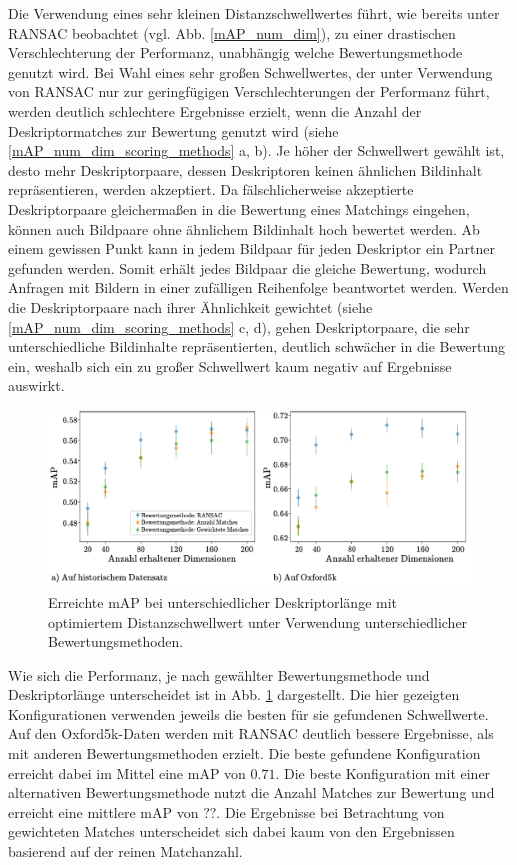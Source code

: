 Die Verwendung eines sehr kleinen Distanzschwellwertes führt, wie bereits unter RANSAC beobachtet (vgl. Abb. \ref{mAP_num_dim}), zu einer drastischen Verschlechterung der Performanz, unabhängig welche Bewertungsmethode genutzt wird. Bei Wahl eines sehr großen Schwellwertes, der unter Verwendung von RANSAC nur zur geringfügigen Verschlechterungen der Performanz führt, werden deutlich schlechtere Ergebnisse erzielt, wenn die Anzahl der Deskriptormatches zur Bewertung genutzt wird (siehe \ref{mAP_num_dim_scoring_methods} a, b). Je höher der Schwellwert gewählt ist, desto mehr Deskriptorpaare, dessen Deskriptoren keinen ähnlichen Bildinhalt repräsentieren, werden akzeptiert. Da fälschlicherweise akzeptierte Deskriptorpaare gleichermaßen in die Bewertung eines Matchings eingehen, können auch Bildpaare ohne ähnlichem Bildinhalt hoch bewertet werden. Ab einem gewissen Punkt kann in jedem Bildpaar für jeden Deskriptor ein Partner gefunden werden. Somit erhält jedes Bildpaar die gleiche Bewertung, wodurch Anfragen mit Bildern in einer zufälligen Reihenfolge beantwortet werden. Werden die Deskriptorpaare nach ihrer Ähnlichkeit gewichtet (siehe \ref{mAP_num_dim_scoring_methods} c, d), gehen Deskriptorpaare, die sehr unterschiedliche Bildinhalte repräsentierten, deutlich schwächer in die Bewertung ein, weshalb sich ein zu großer Schwellwert kaum negativ auf Ergebnisse auswirkt.
\\
\begin{figure}[h]
\includegraphics[scale=0.74]{compare_scoring_methods}
\caption{Erreichte mAP bei unterschiedlicher Deskriptorlänge mit optimiertem Distanzschwellwert unter Verwendung unterschiedlicher Bewertungsmethoden.}
\label{compare_scoring_methods}
\end{figure}
Wie sich die Performanz, je nach gewählter Bewertungsmethode und Deskriptorlänge unterscheidet ist in Abb. \ref{compare_scoring_methods} dargestellt. Die hier gezeigten Konfigurationen verwenden jeweils die besten für sie gefundenen Schwellwerte. Auf den Oxford5k-Daten werden mit RANSAC deutlich bessere Ergebnisse, als mit anderen Bewertungsmethoden erzielt. Die beste gefundene Konfiguration erreicht dabei im Mittel eine mAP von $0.71$. Die beste Konfiguration mit einer alternativen Bewertungsmethode nutzt die Anzahl Matches zur Bewertung und erreicht eine mittlere mAP von $??$. Die Ergebnisse bei Betrachtung von gewichteten Matches unterscheidet sich dabei kaum von den Ergebnissen basierend auf der reinen Matchanzahl.

